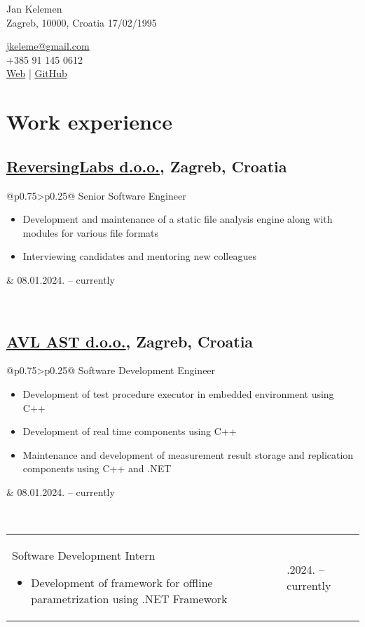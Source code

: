 \documentclass[a4paper]{article}
\makeatletter
\newlength{\tablewidth}
\newenvironment{period}[2]{%
\newcommand{\sarma}{#2}%
\setlength{\tablewidth}{\linewidth}
\addtolength{\tablewidth}{-2\tabcolsep}
\begin{tabular}{@{}p{0.75\tablewidth}>{\raggedleft\arraybackslash}p{0.25\tablewidth}@{}}%
#1 \newline
\begin{itemize}
}{%
\end{itemize} & \sarma \\%
\end{tabular}\\
}
\makeatother
\begin{document}
\fontfamily{\sfdefault}
\selectfont

\begin{minipage}{.5\textwidth}
\LARGE{Jan Kelemen}\\
\normalsize{Zagreb, 10000, Croatia}
\normalsize{17/02/1995}
\end{minipage}%
\begin{minipage}{.5\textwidth}
\raggedleft
\href{mailto:jkeleme@gmail.com}{jkeleme@gmail.com} \\
+385 91 145 0612 \\
\href{http://jan-kelemen.github.io/}{Web} | \href{https://github.com/jan-kelemen}{GitHub}
\end{minipage}

\vspace{1em}

\section{Work experience}
\subsection{\href{https://www.reversinglabs.com/}{ReversingLabs d.o.o.}, Zagreb, Croatia}
\begin{period}{Senior Software Engineer}{08.01.2024. -- currently}
    \item 
        Development and maintenance of a static file analysis engine along with modules for various file formats
    \item 
        Interviewing candidates and mentoring new colleagues
\end{period}
\subsection{\href{https://www.avl.com/}{AVL AST d.o.o.}, Zagreb, Croatia}
\begin{period}{Software Development Engineer}{01.08.2018. -- 31.12.2023.}
    \item
        Development of test procedure executor in embedded environment using C++
    \item
        Development of real time components using C++
    \item
        Maintenance and development of measurement result storage and replication components using C++ and .NET
\end{period}
\begin{period}{Software Development Intern}{17.07.2017. -- 31.07.2018.}
    \item
        Development of framework for offline parametrization using .NET Framework
\end{period}
\end{document}
